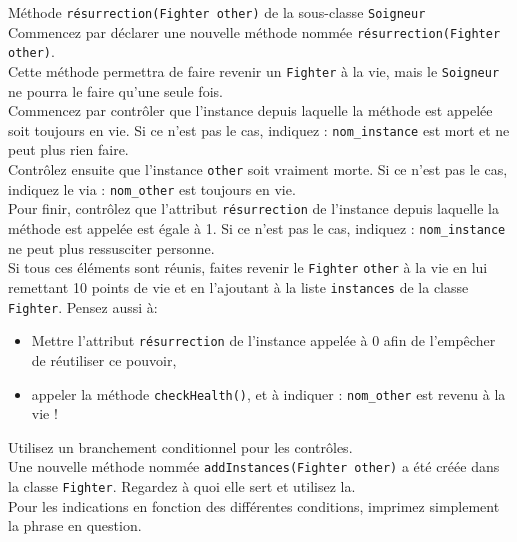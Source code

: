 \begin{Exercice}[10 minutes] Méthode \lstinline{résurrection(Fighter other)} de la sous-classe \lstinline{Soigneur} \\

Commencez par déclarer une nouvelle méthode nommée \lstinline{résurrection(Fighter other)}. \\
Cette méthode permettra de faire revenir un \lstinline{Fighter} à la vie, mais le \lstinline{Soigneur} ne pourra le faire qu'une seule fois. \\

Commencez par contrôler que l'instance depuis laquelle la méthode est appelée soit toujours en vie. Si ce n'est pas le cas, indiquez : \lstinline{nom_instance} est mort et ne peut plus rien faire.  \\ 

Contrôlez ensuite que l'instance \lstinline{other} soit vraiment morte. Si ce n'est pas le cas, indiquez le via : \lstinline{nom_other} est toujours en vie. \\

Pour finir, contrôlez que l'attribut \lstinline{résurrection} de l'instance depuis laquelle la méthode est appelée est égale à 1. Si ce n'est pas le cas, indiquez : \lstinline{nom_instance} ne peut plus ressusciter personne.\\

Si tous ces éléments sont réunis, faites revenir le \lstinline{Fighter} \lstinline{other} à la vie en lui remettant 10 points de vie et en l'ajoutant à la liste \lstinline{instances} de la classe \lstinline{Fighter}. Pensez aussi à:

\begin{itemize}
	\item Mettre l'attribut \lstinline{résurrection} de l'instance appelée à 0 afin de l'empêcher de réutiliser ce pouvoir,
	\item appeler la méthode \lstinline{checkHealth()}, et à indiquer : \lstinline{nom_other} est revenu à la vie !
\end{itemize}

\begin{conseil}
Utilisez un branchement conditionnel pour les contrôles. \\

Une nouvelle méthode nommée \lstinline{addInstances(Fighter other)} a été créée dans la classe \lstinline{Fighter}. Regardez à quoi elle sert et utilisez la. \\

Pour les indications en fonction des différentes conditions, imprimez simplement la phrase en question. \\
\end{conseil}

\begin{solution}
	
\end{solution}

\end{Exercice}

